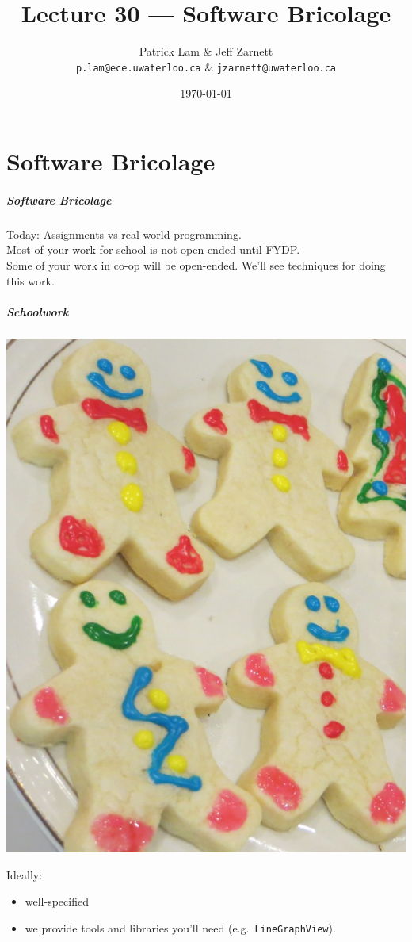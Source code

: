 

\title{Lecture 30 --- Software Bricolage}

\author{Patrick Lam \& Jeff Zarnett\\ \small \texttt{p.lam@ece.uwaterloo.ca} \& \texttt{jzarnett@uwaterloo.ca}}
\date{\today}



\begin{frame}
  \titlepage
\end{frame}

\part{Software Bricolage}
\frame{\partpage}

\begin{frame}
\frametitle{Software Bricolage}
\begin{changemargin}{1cm}
\Large

Today: Assignments vs real-world programming.\\[1em]

Most of your work for school is not open-ended until FYDP.\\[1em]

Some of your work in co-op will be open-ended. We'll see techniques 
for doing this work.
\end{changemargin}

\end{frame}

\begin{frame}
\frametitle{Schoolwork}

\begin{center}
\includegraphics[width=.4\textwidth]{images/1502_cookies}
\end{center}

\begin{changemargin}{1cm}
Ideally:
\begin{itemize}
\item well-specified
\item we provide tools and libraries you'll need (e.g.~{\tt LineGraphView}).
\end{itemize}
\end{changemargin}

\end{frame}

